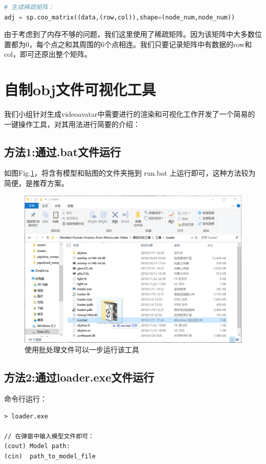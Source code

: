 \documentclass{article}
\begin{document}
\begin{appendices}
\begin{lstlisting}[language=python]
# 生成稀疏矩阵：
adj = sp.coo_matrix((data,(row,col)),shape=(node_num,node_num))	
\end{lstlisting}

由于考虑到了内存不够的问题，我们这里使用了稀疏矩阵。因为该矩阵中大多数位置都为0，每个点之和其周围的6个点相连。我们只要记录矩阵中有数据的row和col，即可还原出整个矩阵。

\section{自制obj文件可视化工具}
我们小组针对生成videoavatar中需要进行的渲染和可视化工作开发了一个简易的一键操作工具\cite{renderingtool}，对其用法进行简要的介绍：

\subsection{方法1:通过.bat文件运行}
如图Fig.\ref{renderrun}，将含有模型和贴图的文件夹拖到 run.bat 上运行即可，这种方法较为简便，是推荐方案。
\begin{figure}
	\centering
	\includegraphics[width=16cm]{figure/rendertool_run}
	\caption{使用批处理文件可以一步运行该工具}
	\label{renderrun}
\end{figure}

\subsection{方法2:通过loader.exe文件运行}
命令行运行：
\begin{lstlisting}
> loader.exe 

// 在弹窗中输入模型文件即可：
(cout) Model path:
(cin)  path_to_model_file
\end{lstlisting}


\end{appendices}
\end{document}
